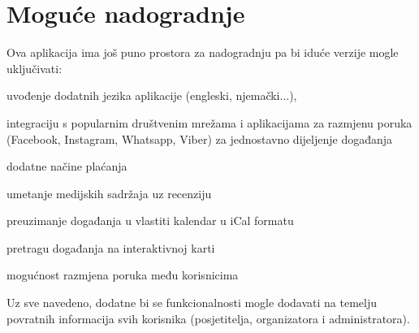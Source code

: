 		\section{Moguće nadogradnje}
		
		Ova aplikacija ima još puno prostora za nadogradnju pa bi iduće verzije mogle uključivati:
			
			\begin{packed_enum}
				\item uvođenje dodatnih jezika aplikacije (engleski, njemački...),
				\item integraciju s popularnim društvenim mrežama i aplikacijama za razmjenu poruka (Facebook, Instagram, Whatsapp, Viber) za jednostavno dijeljenje događanja
				\item dodatne načine plaćanja
				\item umetanje medijskih sadržaja uz recenziju
				\item preuzimanje događanja u vlastiti kalendar u iCal formatu
				\item pretragu događanja na interaktivnoj karti
				\item mogućnost razmjena poruka među korisnicima
			\end{packed_enum}
			
		Uz sve navedeno, dodatne bi se funkcionalnosti mogle dodavati na temelju povratnih informacija svih korisnika (posjetitelja, organizatora i administratora).
		
		\eject
		
	